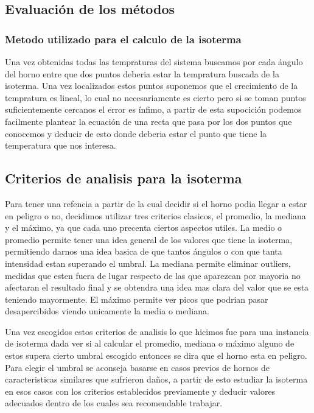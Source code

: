 \subsection{Evaluación de los métodos}

\subsubsection{Metodo utilizado para el calculo de la isoterma}

Una vez obtenidas todas las tempraturas del sistema buscamos por cada ángulo del horno entre que dos puntos deberia estar la tempratura buscada de la isoterma. Una vez localizados estos puntos suponemos que el crecimiento de la tempratura es lineal, lo cual no necesariamente es cierto pero si se toman puntos suficientemente cercanos el error es ínfimo, a partir de esta supocición podemos facilmente plantear la ecuación de una recta que pasa por los dos puntos que conocemos y deducir de esto donde deberia estar el punto que tiene la temperatura que nos interesa.

\subsection{Criterios de analisis para la isoterma}
 Para tener una refencia a partir de la cual decidir si el horno podia llegar a estar en peligro o no, decidimos utilizar tres criterios clasicos, el promedio, la mediana y el máximo, ya que cada uno precenta ciertos aspectos utiles. La medio o promedio permite tener una idea general de los valores que tiene la isoterma, permitiendo darnos una idea basica de que tantos ángulos o con que tanta intensidad estan superando el umbral. La mediana permite eliminar outliers, medidas que esten fuera de lugar respecto de las que aparezcan por mayoria no afectaran el resultado final y se obtendra una idea mas clara del valor que se esta teniendo mayormente. El máximo permite ver picos que podrian pasar desapercibidos viendo unicamente la media o mediana.

Una vez escogidos estos criterios de analisis lo que hicimos fue para una instancia de isoterma dada ver si al calcular el promedio, mediana o máximo alguno de estos supera cierto umbral escogido entonces se dira que el horno esta en peligro. Para elegir el umbral se aconseja basarse en casos previos de hornos de caracteristicas similares que sufrieron daños, a partir de esto estudiar la isoterma en esos casos con los criterios establecidos previamente y deducir valores adecuados dentro de los cuales sea recomendable trabajar.

